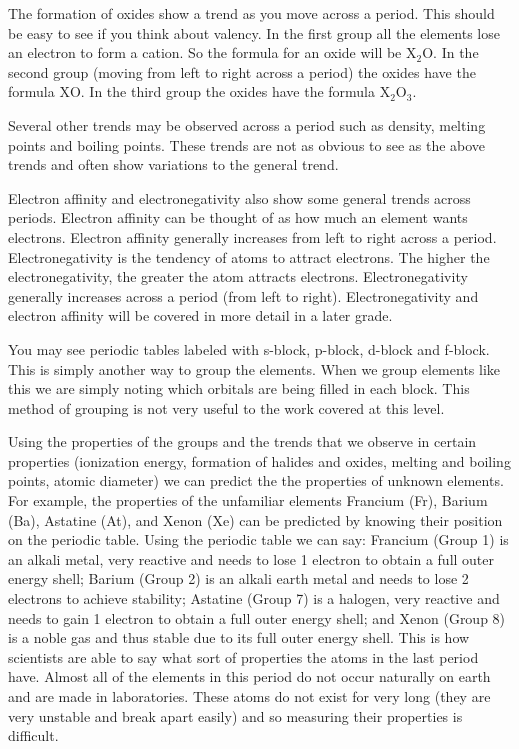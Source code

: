 \label{m38760*id7231}The formation of oxides show a trend as you move across a period. This should be easy to see if you think about valency. In the first group all the elements lose an electron to form a cation. So the formula for an oxide will be  ${\mathrm{X}}_{2}\mathrm{O}$. In the second group (moving from left to right across a period) the oxides have the formula $\mathrm{X}\mathrm{O}$. In the third group the oxides have the formula ${\mathrm{X}}_{2}{\mathrm{O}}_{3}$. \par 
\label{m38760*id7342}
Several other trends may be observed across a period such as density, melting points and boiling points. These trends are not as obvious to see as the above trends and often show variations to the general trend.\par 
\label{m38760*eip-217}Electron affinity and electronegativity also show some general trends across periods. Electron affinity can be thought of as how much an element wants electrons. Electron affinity generally increases from left to right across a period. Electronegativity is the tendency of atoms to attract electrons. The higher the electronegativity, the greater the atom attracts electrons. Electronegativity generally increases across a period (from left to right). Electronegativity and electron affinity will be covered in more detail in a later grade.\par \label{m38760*eip-293}You may see periodic tables labeled with s-block, p-block, d-block and f-block. This is simply another way to group the elements. When we group elements like this we are simply noting which orbitals are being filled in each block. This method of grouping is not very useful to the work covered at this level.\par 
\label{m38760*eip-151}Using the properties of the groups and the trends that we observe in certain properties (ionization energy, formation of halides and oxides, melting and boiling points, atomic diameter) we can predict the the properties of unknown elements. For example, the properties of the unfamiliar elements Francium (Fr), Barium (Ba), Astatine (At), and Xenon (Xe) can be predicted by knowing their position on the periodic table. Using the periodic table we can say: Francium (Group 1) is an alkali metal, very reactive and needs to lose 1 electron to obtain a full outer energy shell; Barium (Group 2) is an alkali earth metal and needs to lose 2 electrons to achieve stability; Astatine (Group 7) is a halogen, very reactive and needs to gain 1 electron to obtain a full outer energy shell; and Xenon (Group 8) is a noble gas and thus stable due to its full outer energy shell.   This is how scientists are able to say what sort of properties the atoms in the last period have. Almost all of the elements in this period do not occur naturally on earth and are made in laboratories. These atoms do not exist for very long (they are very unstable and break apart easily) and so measuring their properties is difficult.\par \label{m38760*secfhsst!!!underscore!!!id1062}
